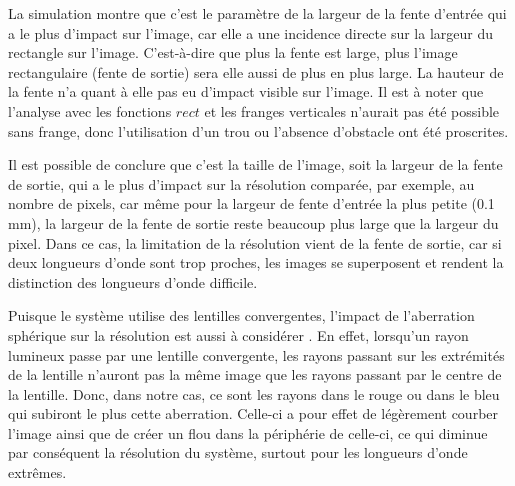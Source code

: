 \documentclass[conference]{IEEEtran}
\begin{document}
La simulation montre que c'est le paramètre de la largeur de la fente d'entrée qui a le plus d'impact sur l'image,
car elle a une incidence directe sur la largeur du rectangle sur l'image. C'est-à-dire que plus la fente est large, plus
l'image rectangulaire (fente de sortie) sera elle aussi de plus en plus large. La hauteur de la fente n'a quant à elle pas eu d'impact
visible sur l'image. 
Il est à noter que l'analyse avec les fonctions $rect$ et les franges verticales n'aurait pas été possible sans frange, donc l'utilisation d'un trou ou l'absence d'obstacle ont été proscrites.

Il est possible de conclure que c'est la taille de l'image, soit la largeur de la fente de sortie, qui a le plus d'impact sur la résolution comparée, par exemple, au nombre de pixels,
car même pour la largeur de fente d'entrée la plus petite (0.1 mm), la largeur de la fente de sortie reste beaucoup plus large que la largeur du pixel.
Dans ce cas, la limitation de la résolution vient de la fente de sortie, car si deux longueurs d'onde sont trop proches, les images se superposent
et rendent la distinction des longueurs d'onde difficile.



Puisque le système utilise des lentilles convergentes, l'impact de l'aberration sphérique sur la résolution est aussi à considérer \cite{edmund_optics_aberrations}.
En effet, lorsqu'un rayon lumineux passe par une lentille convergente, les rayons passant sur les extrémités de la lentille
n'auront pas la même image que les rayons passant par le centre de la lentille. Donc, dans notre cas, ce sont les
rayons dans le rouge ou dans le bleu qui subiront le plus cette aberration. Celle-ci a pour effet de légèrement courber l'image
ainsi que de créer un flou dans la périphérie de celle-ci, ce qui diminue par conséquent la résolution du système, surtout pour les longueurs d'onde
extrêmes. 
\end{document}
